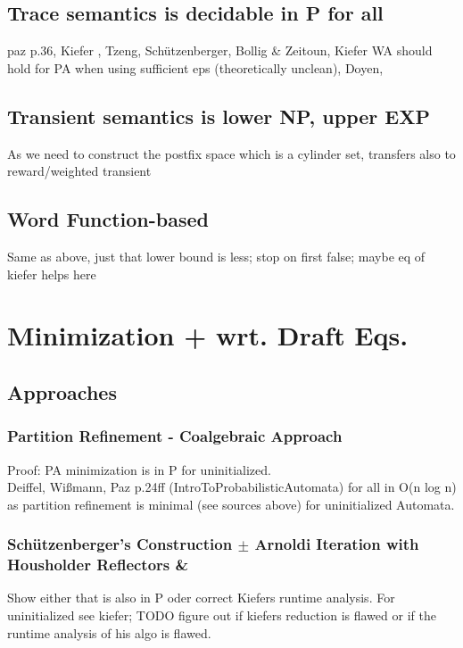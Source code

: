        \subsection{Trace semantics is decidable in P for all}
                paz p.36, Kiefer  , Tzeng, Schützenberger, Bollig \& Zeitoun, Kiefer WA should hold for PA when using sufficient eps (theoretically unclean), Doyen, 
            
        \subsection{Transient semantics is lower NP, upper EXP}
            As we need to construct the postfix space which is a cylinder set, transfers also to reward/weighted transient
            
        \subsection{Word Function-based}
            Same as above, just that lower bound is less; stop on first false; maybe eq of kiefer helps here
                
        
            
     
    \section{Minimization + wrt. Draft Eqs.}
        \begin{definition}
         
        \end{definition}
        \subsection{Approaches}
            \subsubsection{Partition Refinement - Coalgebraic Approach}
            Proof: PA minimization is in P for uninitialized. \\
            Deiffel, Wißmann, Paz p.24ff (IntroToProbabilisticAutomata)
            for all in O(n log n) as partition refinement is minimal (see sources above) for uninitialized Automata. \\
        
            \subsubsection{Schützenberger's Construction $\pm$ Arnoldi Iteration with Housholder Reflectors \& }
            Show either that is also in P oder correct Kiefers runtime analysis.
            For uninitialized see kiefer; TODO figure out if kiefers reduction is flawed or if the runtime analysis of his algo is flawed.
            

